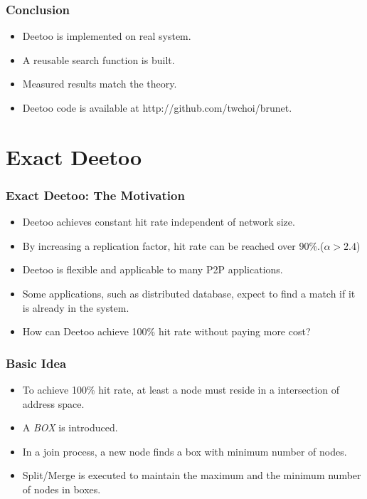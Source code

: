 \documentclass[red]{beamer}
\begin{document}
\begin{frame}
\frametitle{Conclusion}
\begin{itemize}
\item Deetoo is implemented on real system.
\item A reusable search function is built.
\item Measured results match the theory.
\item Deetoo code is available at http://github.com/twchoi/brunet.
\end{itemize}
\end{frame}

\section{Exact Deetoo}

\begin{frame}
\frametitle{Exact Deetoo: The Motivation}
\begin{itemize}
\item Deetoo achieves constant hit rate independent of network size.
\item By increasing a replication factor, hit rate can be reached over 90\%.($\alpha > 2.4$)
\item Deetoo is flexible and applicable to many P2P applications.
\item Some applications, such as distributed database, expect to find a match if it is already in the system. 
\item How can Deetoo achieve 100\% hit rate without paying more cost?
\end{itemize}
\end{frame}

\begin{frame}
\frametitle{Basic Idea}
\begin{itemize}
\item To achieve 100\% hit rate, at least a node must reside in 
a intersection of address space.
\item A \textit{BOX} is introduced.
\item In a join process, a new node finds a box with minimum number of nodes.
\item Split/Merge is executed to maintain the maximum and the minimum number of nodes in boxes.
\end{itemize}
\end{frame}
\end{document}
